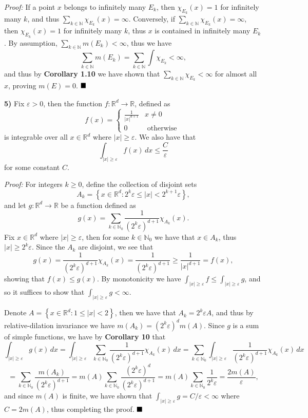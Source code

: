 \documentclass[12pt]{article}
\newcommand{\N}{\ensuremath{\mathbb{N}}}
\newcommand{\R}{\ensuremath{\mathbb{R}}}
\newcommand{\e}{\ensuremath{\varepsilon}}
\newcommand{\braceb}[1]{\left\{#1\right\}}
\newcommand{\parenb}[1]{\left(#1\right)}
\newcommand{\vertb}[1]{\left\vert#1\right\vert}
\newcommand{\proof}{\textit{Proof: }}
\newcommand{\done}{\ensuremath{\strut\hfill\blacksquare}}
\renewcommand{\t}[1]{\text{ #1 }}
\newcommand{\sectionskip}{\vspace{0.15in}}
\begin{document}
\proof
If a point \( x \) belongs to infinitely many \( E_k \), then
\( \chi_{E_k}(x) = 1 \) for infinitely many \( k \), and thus
\( \sum_{k \in \N} \chi_{E_k}(x) = \infty \).
Conversely, if \( \sum_{k \in \N} \chi_{E_k}(x) = \infty \), then
\( \chi_{E_k}(x) = 1 \) for infinitely many \( k \), thus \( x \) is contained
in infinitely many \( E_k \).
By assumption, \( \sum_{k \in \N} m(E_k) < \infty \), thus we have
\[
	\sum_{k \in \N} m(E_k)
	= \sum_{k \in \N} \int \chi_{E_k}
	< \infty,
\]
and thus by \textbf{Corollary 1.10} we have shown that
\( \sum_{k \in \N} \chi_{E_k} < \infty \) for almost all \( x \), proving
\( m(E) = 0 \).
\done

\sectionskip

\textbf{5)}
Fix \( \e > 0 \), then the function \( f : \R^d \to \R \), defined as
\[
	f(x)
	= \begin{cases}
		\frac{1}{\vertb{x}^{d + 1}} & x \ne 0       \\
		0                           & \t{otherwise}
	\end{cases}
\]
is integrable over all \( x \in \R^d \) where \( \vertb{x} \geq \e \).
We also have that
\[
	\int_{\vertb{x} \geq \e} f(x) \, dx
	\leq \frac{C}{\e}
\]
for some constant \( C \).

\proof
For integers \( k \geq 0 \), define the collection of disjoint sets
\[
	A_k = \braceb{x \in \R^d : 2^k\e \leq \vertb{x} < 2^{k + 1}\e},
\]
and let
\( g : \R^d \to \R \) be a function defined as
\[
	g(x)
	= \sum_{k \in \N_0} \frac{1}{\parenb{2^{k}\e}^{d + 1}} \chi_{A_k}(x).
\]
Fix \( x \in \R^d \) where \( \vertb{x} \geq \e \), then for some
\( k \in \N_0 \) we have that \( x \in A_k \), thus \( \vertb{x} \geq 2^k\e \).
Since the \( A_k \) are disjoint, we see that
\[
	g(x)
	= \frac{1}{\parenb{2^{k}\e}^{d + 1}} \chi_{A_k}(x)
	= \frac{1}{(2^k\e)^{d + 1}}
	\geq \frac{1}{\vertb{x}^{d + 1}}
	= f(x),
\]
showing that \( f(x) \leq g(x) \).
By monotonicity we have
\( \int_{\vertb{x} \geq \e} f \leq \int_{\vertb{x} \geq \e} g \), and so it
suffices to show that \( \int_{\vertb{x} \geq \e} g < \infty \).

Denote \( A = \braceb{x \in \R^d : 1 \leq \vertb{x} < 2} \), then we have that
\( A_k = 2^k\e A \), and thus by relative-dilation invariance we have
\( m(A_k) = (2^k\e)^d m(A) \).
Since \( g \) is a sum of simple functions, we have by \textbf{Corollary 10}
that
\[
	\int_{\vertb{x} \geq \e} g(x) \, dx
	= \int_{\vertb{x} \geq \e} \sum_{k \in \N_0}
	\frac{1}{\parenb{2^k\e}^{d + 1}} \chi_{A_k}(x) \, dx
	= \sum_{k \in \N_0} \int_{\vertb{x} \geq \e}
	\frac{1}{\parenb{2^k\e}^{d + 1}} \chi_{A_k}(x) \, dx
\]
\[
	= \sum_{k \in \N_0} \frac{m(A_k)}{\parenb{2^k\e}^{d + 1}}
	= m(A) \sum_{k \in \N_0} \frac{
		\parenb{2^k\e}^{d}
	}{
		\parenb{2^k\e}^{d + 1}
	}
	= m(A) \sum_{k \in \N_0} \frac{1}{2^k\e}
	= \frac{2m(A)}{\e},
\]
and since \( m(A) \) is finite, we have shown that
\( \int_{\vertb{x} \geq \e} g = C/\e < \infty \) where \( C = 2m(A) \), thus
completing the proof.
\done
\end{document}

